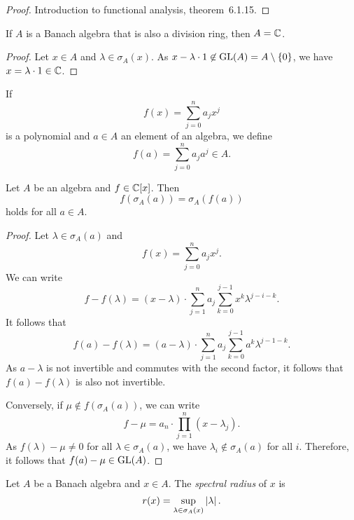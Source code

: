 \begin{proof}
Introduction to functional analysis, theorem~6.1.15.
\end{proof}

\begin{izrek}
If $A$ is a Banach algebra that is also a division ring, then
$A = \mathbb{C}$.
\end{izrek}

\begin{proof}
Let $x \in A$ and $\lambda \in \sigma_A(x)$. As
$x - \lambda \cdot 1 \not \in \operatorname{GL}(A) = A \setminus \left\{0\right\}$, we
have $x = \lambda \cdot 1 \in \mathbb{C}$.
\end{proof}

\begin{definicija}
If
\[
f(x) = \sum_{j=0}^n a_j x^j
\]
is a polynomial and $a \in A$ an element of an algebra, we define
\[
f(a) = \sum_{j=0}^n a_j a^j \in A.
\]
\end{definicija}

\begin{izrek}
Let $A$ be an algebra and $f \in \mathbb{C}[x]$. Then
\[
f(\sigma_A(a)) = \sigma_A(f(a))
\]
holds for all $a \in A$.
\end{izrek}

\begin{proof}
Let $\lambda \in \sigma_A(a)$ and
\[
f(x) = \sum_{j=0}^n a_j x^j.
\]
We can write
\[
f - f(\lambda) =
(x - \lambda) \cdot
\sum_{j=1}^n a_j \sum_{k=0}^{j-1} x^k \lambda^{j-i-k}.
\]
It follows that
\[
f(a) - f(\lambda) =
(a - \lambda) \cdot
\sum_{j=1}^n a_j \sum_{k=0}^{j-1} a^k \lambda^{j-1-k}.
\]
As $a - \lambda$ is not invertible and commutes with the second
factor, it follows that $f(a) - f(\lambda)$ is also not invertible.

Conversely, if $\mu \not \in f(\sigma_A(a))$, we can write
\[
f - \mu = a_n \cdot \prod_{j=1}^n (x - \lambda_j).
\]
As $f(\lambda) - \mu \ne 0$ for all $\lambda \in \sigma_A(a)$, we
have $\lambda_i \not \in \sigma_A(a)$ for all $i$. Therefore, it
follows that $f(a) - \mu \in \operatorname{GL}(A)$.
\end{proof}

\begin{definicija}
Let $A$ be a Banach algebra and $x \in A$. The
\emph{spectral radius} of $x$ is
\[
r(x) = \sup_{\lambda \in \sigma_A(x)} \left\lvert \lambda\right\rvert.
\]
\end{definicija}

